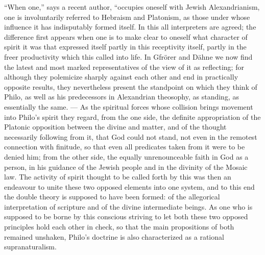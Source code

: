 \documentclass[12pt,a4paper,openany]{book}
\newcommand{\opage}[1]{\marginnote{\footnotesize\textit{[#1]}}}
\begin{document}
``When one,'' says a recent author, ``occupies oneself with Jewish Alexandrianism, one is involuntarily referred to
Hebraism and Platonism, as those under whose influence it has indisputably formed itself. In this all interpreters
are agreed; the difference first appears when one is to make clear to oneself what character of spirit it was that
expressed itself partly in this receptivity itself, partly in the freer productivity which this called into life. In
Gfrörer and Dähne we now find the latest and most marked representatives of the view of it as reflecting; for
although they polemicize sharply against each other and end in practically opposite results, they nevertheless
present the standpoint on which they think of Philo, as well as his predecessors in Alexandrian theosophy, as
standing, as essentially the same. --- As the spiritual forces whose collision brings movement into Philo's spirit
they regard, from the one side, the definite appropriation of the Platonic opposition between the divine and matter,
and of the thought necessarily following from it, that God could not stand, not even in the remotest connection with
finitude, so that even all predicates taken from it were to be denied him; from the other side, the equally
unrenounceable faith in God as a person, in his guidance of the Jewish people and in the divinity of the Mosaic law.
The activity of spirit thought to be called forth by this was then an endeavour to unite these two opposed elements
into one system, and to this end the double theory is supposed to have been formed: of the allegorical interpretation
of scripture and of the
\opage{88}divine intermediate beings. As one who is supposed to be borne by this conscious striving to let both these
two opposed principles hold each other in check, so that the main propositions of both remained unshaken, Philo's
doctrine is also characterized as a rational supranaturalism.
\end{document}
